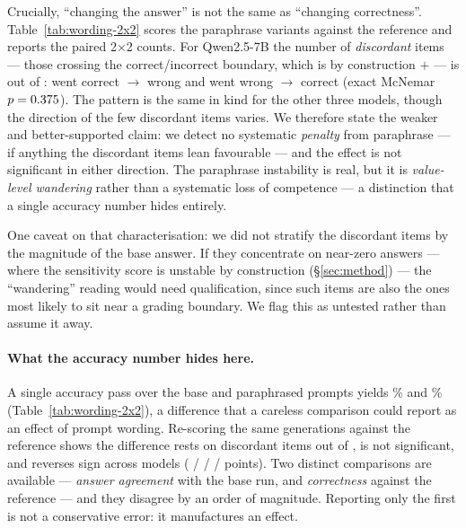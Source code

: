 \documentclass[10pt,letterpaper]{article}
\begin{document}
Crucially, ``changing the answer'' is not the same as ``changing correctness''.
Table~\ref{tab:wording-2x2} scores the paraphrase variants against the reference and
reports the paired 2$\times$2 counts. For Qwen2.5-7B the number of \emph{discordant}
items --- those crossing the correct/incorrect boundary, which is by construction
\nbRightToWrong{} $+$ \nbWrongToRight{} --- is \nbWordingFlips{} out of
\nbWordingCovered{}: \nbRightToWrong{} went correct $\rightarrow$ wrong and
\nbWrongToRight{} went wrong $\to$ correct (exact McNemar $p=0.375$). The
pattern is the same in kind for the other three models, though the direction of the
few discordant items varies. We therefore state the weaker and better-supported
claim: we detect no systematic \emph{penalty} from paraphrase --- if anything the
discordant items lean favourable --- and the effect is not significant in either
direction. The paraphrase instability is real, but it is
\emph{value-level wandering} rather than a systematic loss of competence --- a
distinction that a single accuracy number hides entirely.

One caveat on that characterisation: we did not stratify the discordant items by the
magnitude of the base answer. If they concentrate on near-zero answers --- where the
sensitivity score is unstable by construction (\S\ref{sec:method}) --- the
``wandering'' reading would need qualification, since such items are also the ones
most likely to sit near a grading boundary. We flag this as untested rather than
assume it away.



\paragraph{What the accuracy number hides here.}
A single accuracy pass over the base and paraphrased prompts yields
\pairBaseSevenB\% and \pairVarSevenB\% (Table~\ref{tab:wording-2x2}), a difference
that a careless comparison could report as an effect of prompt wording. Re-scoring
the same generations against the reference shows the difference rests on
\nbWordingFlips{} discordant items out of \nbWordingCovered{}, is not significant,
and reverses sign across models (\pairDeltaPPThreeB{} / \pairDeltaPPSevenB{} /
\pairDeltaPPFourteenB{} / \pairDeltaPPLlamaEightB{} points). Two distinct
comparisons are available --- \emph{answer agreement} with the base run, and
\emph{correctness} against the reference --- and they disagree by an order of
magnitude. Reporting only the first is not a conservative error: it manufactures
an effect.
\end{document}
